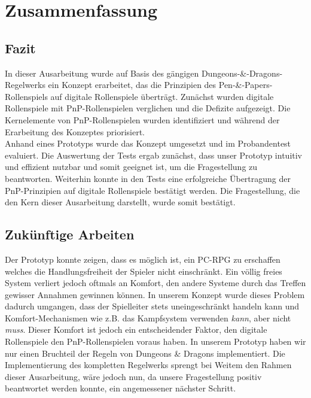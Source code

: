 \chapter{Zusammenfassung}
\label{conclusion}

\section{Fazit}

In dieser Ausarbeitung wurde auf Basis des gängigen Dungeons-\&-Dragons-Regelwerks ein Konzept erarbeitet, das die Prinzipien des Pen-\&-Papers-Rollenspiels auf digitale Rollenspiele überträgt. Zunächst wurden digitale Rollenspiele mit PnP-Rollenspielen verglichen und die Defizite aufgezeigt. Die Kernelemente von PnP-Rollenspielen wurden identifiziert und während der Erarbeitung des Konzeptes priorisiert.\\
Anhand eines Prototyps wurde das Konzept umgesetzt und im Probandentest evaluiert. Die Auswertung der Tests ergab zunächst, dass unser Prototyp intuitiv und effizient nutzbar und somit geeignet ist, um die Fragestellung zu beantworten. Weiterhin konnte in den Tests eine erfolgreiche Übertragung der PnP-Prinzipien auf digitale Rollenspiele bestätigt werden. Die Fragestellung, die den Kern dieser Ausarbeitung darstellt, wurde somit bestätigt.

\section{Zukünftige Arbeiten}
\label{sec:futurework}

Der Prototyp konnte zeigen, dass es möglich ist, ein PC-RPG zu erschaffen welches die Handlungsfreiheit der Spieler nicht einschränkt. Ein völlig freies System verliert jedoch oftmals an Komfort, den andere Systeme durch das Treffen gewisser Annahmen gewinnen können. In unserem Konzept wurde dieses Problem dadurch umgangen, dass der Spielleiter stets uneingeschränkt handeln kann und Komfort-Mechanismen wie z.B. das Kampfsystem verwenden \emph{kann}, aber nicht \emph{muss}. Dieser Komfort ist jedoch ein entscheidender Faktor, den digitale Rollenspiele den PnP-Rollenspielen voraus haben. In unserem Prototyp haben wir nur einen Bruchteil der Regeln von Dungeons \& Dragons implementiert. Die Implementierung des kompletten Regelwerks sprengt bei Weitem den Rahmen dieser Ausarbeitung, wäre jedoch nun, da unsere Fragestellung positiv beantwortet werden konnte, ein angemessener nächster Schritt.


